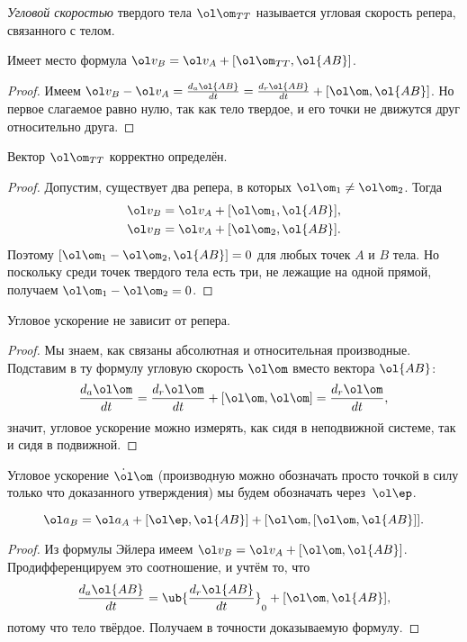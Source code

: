 \documentclass[a4paper,12pt]{article}
\def\w{\ol\om}
\def\a{\ol a}
\def\v{\ol v}
\def\vep{\ol\ep}
\def\d{\dot}
\begin{document}
\begin{df}
\emph{Угловой скоростью} твердого тела $\w_{TT}$
называется угловая скорость репера, связанного с телом.
\end{df}

\begin{stm}
Имеет место формула $\v_B=\v_A+[\w_{TT},\ol{AB}]$.
\end{stm}
\begin{proof}
Имеем $\v_B-\v_A=\frac{d_a\ol{AB}}{dt}=\frac{d_r\ol{AB}}{dt}+[\w,\ol{AB}]$. Но
первое слагаемое равно нулю, так как тело твердое, и его точки не движутся друг относительно друга.
\end{proof}

\begin{imp}[Корректность определения $\w_{TT}$]
Вектор $\w_{TT}$ корректно определён.
\end{imp}
\begin{proof}
Допустим, существует два репера, в которых $\w_1\ne\w_2$. Тогда
\begin{gather*}
\v_B=\v_A+[\w_1,\ol{AB}],\\
\v_B=\v_A+[\w_2,\ol{AB}].
\end{gather*}
Поэтому $[\w_1-\w_2, \ol{AB}]=0$ для любых точек $A$ и $B$ тела.
Но поскольку среди точек твердого тела есть три, не лежащие на одной
прямой, получаем $\w_1-\w_2=0$.
\end{proof}

\begin{stm}
Угловое ускорение не зависит от репера.
\end{stm}
\begin{proof}
Мы знаем, как связаны абсолютная и относительная производные. Подставим
в ту формулу угловую скорость $\w$ вместо вектора $\ol{AB}$:
$$\frac{d_a\w}{dt}=\frac{d_r\w}{dt}+[\w,\w]=\frac{d_r\w}{dt},$$
значит, угловое ускорение можно измерять, как сидя в
неподвижной системе, так и сидя в подвижной.
\end{proof}

Угловое ускорение $\d\w$ (производную можно обозначать просто точкой в силу
только что доказанного утверждения) мы будем обозначать через~$\vep$.

\begin{imp}
$$\a_B=\a_A+[\vep,\ol{AB}]+[\w,[\w,\ol{AB}]].$$
\end{imp}
\begin{proof}
Из формулы Эйлера имеем $\v_B=\v_A+[\w,\ol{AB}]$. Продифференцируем это соотношение,
и учтём то, что
$$\frac{d_a \ol{AB}}{dt} = \ub{\frac{d_r\ol{AB}}{dt}}_0 + [\w,\ol{AB}],$$
потому что тело твёрдое.
Получаем в точности доказываемую формулу.
\end{proof}
\end{document}
